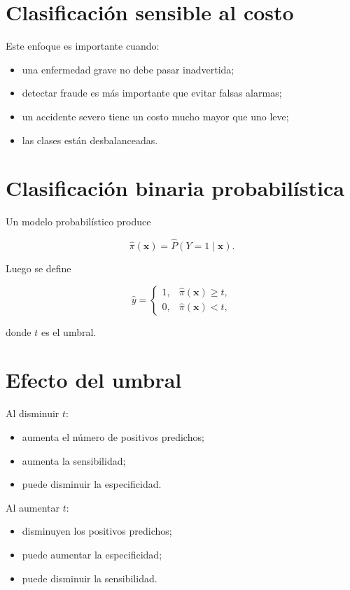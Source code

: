 \documentclass[
  spanish,
  11pt,
  letterpaper,
  DIV=11,
  numbers=noendperiod]{scrreprt}
\providecommand{\tightlist}{%
  \setlength{\itemsep}{0pt}\setlength{\parskip}{0pt}}
\theoremstyle{definition}
\theoremstyle{plain}
\theoremstyle{definition}
\theoremstyle{remark}
\begin{document}
\section{Clasificación sensible al
costo}\label{clasificaciuxf3n-sensible-al-costo}

Este enfoque es importante cuando:

\begin{itemize}
\tightlist
\item
  una enfermedad grave no debe pasar inadvertida;
\item
  detectar fraude es más importante que evitar falsas alarmas;
\item
  un accidente severo tiene un costo mucho mayor que uno leve;
\item
  las clases están desbalanceadas.
\end{itemize}

\section{Clasificación binaria
probabilística}\label{clasificaciuxf3n-binaria-probabiluxedstica}

Un modelo probabilístico produce

\[
\widehat{\pi}(\mathbf{x})
=
\widehat{P}(Y=1\mid\mathbf{x}).
\]

Luego se define

\[
\widehat{y}
=
\begin{cases}
1, & \widehat{\pi}(\mathbf{x})\geq t,\\
0, & \widehat{\pi}(\mathbf{x})<t,
\end{cases}
\]

donde \(t\) es el umbral.

\section{Efecto del umbral}\label{efecto-del-umbral}

Al disminuir \(t\):

\begin{itemize}
\tightlist
\item
  aumenta el número de positivos predichos;
\item
  aumenta la sensibilidad;
\item
  puede disminuir la especificidad.
\end{itemize}

Al aumentar \(t\):

\begin{itemize}
\tightlist
\item
  disminuyen los positivos predichos;
\item
  puede aumentar la especificidad;
\item
  puede disminuir la sensibilidad.
\end{itemize}
\end{document}
